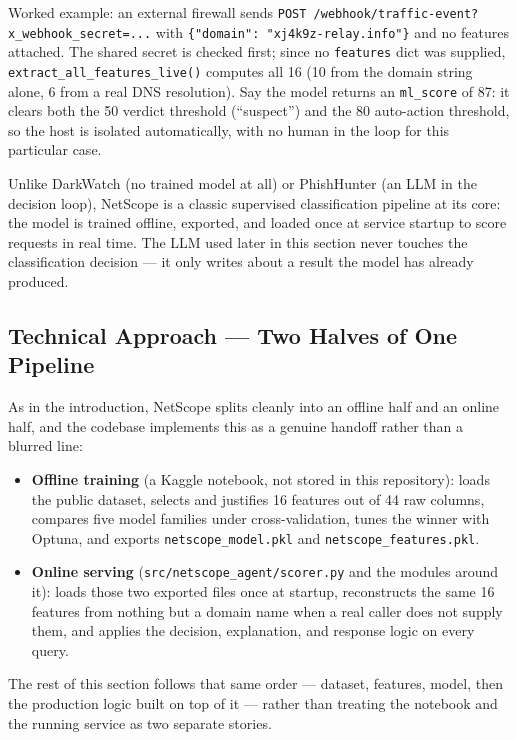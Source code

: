 Worked example: an external firewall sends
\texttt{POST /webhook/traffic-event?x\_webhook\_secret=...} with
\texttt{\{"domain": "xj4k9z-relay.info"\}} and no features attached. The
shared secret is checked first; since no \texttt{features} dict was
supplied, \texttt{extract\_all\_features\_live()} computes all 16 (10 from
the domain string alone, 6 from a real DNS resolution). Say the model
returns an \texttt{ml\_score} of 87: it clears both the 50 verdict
threshold (``suspect'') and the 80 auto-action threshold, so the host is
isolated automatically, with no human in the loop for this particular case.

Unlike DarkWatch (no trained model at all) or PhishHunter (an LLM in the
decision loop), NetScope is a classic supervised classification pipeline at
its core: the model is trained offline, exported, and loaded once at
service startup to score requests in real time. The LLM used later in this
section never touches the classification decision --- it only writes about
a result the model has already produced.

\subsection*{Technical Approach --- Two Halves of One Pipeline}
As in the introduction, NetScope splits cleanly into an offline half and an
online half, and the codebase implements this as a genuine handoff rather
than a blurred line:

\begin{itemize}[nosep]
\item \textbf{Offline training} (a Kaggle notebook, not stored in this repository): loads the public dataset, selects and justifies 16 features out of 44 raw columns, compares five model families under cross-validation, tunes the winner with Optuna, and exports \texttt{netscope\_model.pkl} and \texttt{netscope\_features.pkl}.
\item \textbf{Online serving} (\texttt{src/netscope\_agent/scorer.py} and the modules around it): loads those two exported files once at startup, reconstructs the same 16 features from nothing but a domain name when a real caller does not supply them, and applies the decision, explanation, and response logic on every query.
\end{itemize}

The rest of this section follows that same order --- dataset, features,
model, then the production logic built on top of it --- rather than
treating the notebook and the running service as two separate stories.

